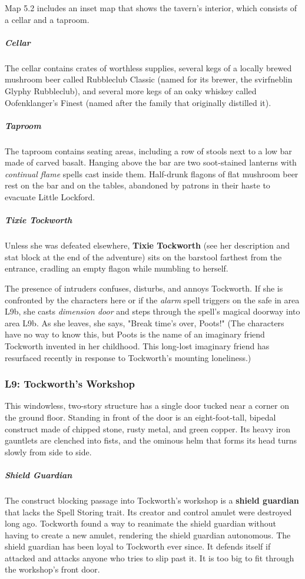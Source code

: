 \documentclass[10pt,a4paper,twoside,bg=print,twocolumn,openany,nodeprecatedcode]{dndbook}
\begin{document}
Map 5.2 includes an inset map that shows the tavern's interior, which consists of a cellar and a taproom.

\subparagraph{Cellar}
The cellar contains crates of worthless supplies, several kegs of a locally brewed mushroom beer called Rubbleclub Classic (named for its brewer, the svirfneblin Glyphy Rubbleclub), and several more kegs of an oaky whiskey called Oofenklanger's Finest (named after the family that originally distilled it).

\subparagraph{Taproom}
The taproom contains seating areas, including a row of stools next to a low bar made of carved basalt. Hanging above the bar are two soot-stained lanterns with \textit{continual flame} spells cast inside them. Half-drunk flagons of flat mushroom beer rest on the bar and on the tables, abandoned by patrons in their haste to evacuate Little Lockford.

\subparagraph{Tixie Tockworth}
Unless she was defeated elsewhere, \textbf{Tixie Tockworth} (see her description and stat block at the end of the adventure) sits on the barstool farthest from the entrance, cradling an empty flagon while mumbling to herself.

The presence of intruders confuses, disturbs, and annoys Tockworth. If she is confronted by the characters here or if the \textit{alarm} spell triggers on the safe in area L9b, she casts \textit{dimension door} and steps through the spell's magical doorway into area L9b. As she leaves, she says, "Break time's over, Poots!" (The characters have no way to know this, but Poots is the name of an imaginary friend Tockworth invented in her childhood. This long-lost imaginary friend has resurfaced recently in response to Tockworth's mounting loneliness.)

\subsubsection{L9: Tockworth's Workshop}
\begin{DndReadAloud}{}
This windowless, two-story structure has a single door tucked near a corner on the ground floor. Standing in front of the door is an eight-foot-tall, bipedal construct made of chipped stone, rusty metal, and green copper. Its heavy iron gauntlets are clenched into fists, and the ominous helm that forms its head turns slowly from side to side.

\end{DndReadAloud}

\subparagraph{Shield Guardian}
The construct blocking passage into Tockworth's workshop is a \textbf{shield guardian} that lacks the Spell Storing trait. Its creator and control amulet were destroyed long ago. Tockworth found a way to reanimate the shield guardian without having to create a new amulet, rendering the shield guardian autonomous. The shield guardian has been loyal to Tockworth ever since. It defends itself if attacked and attacks anyone who tries to slip past it. It is too big to fit through the workshop's front door.
\end{document}
